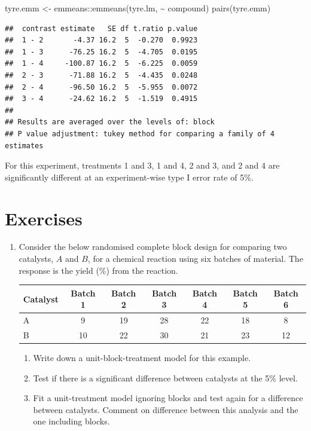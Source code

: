 \documentclass[
]{book}
\newenvironment{Shaded}{\begin{snugshade}}{\end{snugshade}}
\newcommand{\FunctionTok}[1]{\textcolor[rgb]{0.00,0.00,0.00}{#1}}
\newcommand{\NormalTok}[1]{#1}
\newcommand{\OtherTok}[1]{\textcolor[rgb]{0.56,0.35,0.01}{#1}}
\newcommand{\SpecialCharTok}[1]{\textcolor[rgb]{0.00,0.00,0.00}{#1}}
\providecommand{\tightlist}{%
  \setlength{\itemsep}{0pt}\setlength{\parskip}{0pt}}
\theoremstyle{definition}
\theoremstyle{definition}
\theoremstyle{definition}
\theoremstyle{definition}
\theoremstyle{remark}
\begin{document}
\begin{Shaded}
\begin{Highlighting}[]
\NormalTok{tyre.emm }\OtherTok{\textless{}{-}}\NormalTok{ emmeans}\SpecialCharTok{::}\FunctionTok{emmeans}\NormalTok{(tyre.lm, }\SpecialCharTok{\textasciitilde{}}\NormalTok{ compound)}
\FunctionTok{pairs}\NormalTok{(tyre.emm)}
\end{Highlighting}
\end{Shaded}

\begin{verbatim}
##  contrast estimate   SE df t.ratio p.value
##  1 - 2       -4.37 16.2  5  -0.270  0.9923
##  1 - 3      -76.25 16.2  5  -4.705  0.0195
##  1 - 4     -100.87 16.2  5  -6.225  0.0059
##  2 - 3      -71.88 16.2  5  -4.435  0.0248
##  2 - 4      -96.50 16.2  5  -5.955  0.0072
##  3 - 4      -24.62 16.2  5  -1.519  0.4915
## 
## Results are averaged over the levels of: block 
## P value adjustment: tukey method for comparing a family of 4 estimates
\end{verbatim}

For this experiment, treatments 1 and 3, 1 and 4, 2 and 3, and 2 and 4 are significantly different at an experiment-wise type I error rate of 5\%.

\hypertarget{exercises-2}{%
\section{Exercises}\label{exercises-2}}

\begin{enumerate}
\def\labelenumi{\arabic{enumi}.}
\item
  Consider the below randomised complete block design for comparing two catalysts, \(A\) and \(B\), for a chemical reaction using six batches of material. The response is the yield (\%) from the reaction.

  \begin{longtable}[]{@{}lcccccc@{}}
  \toprule
  Catalyst & Batch 1 & Batch 2 & Batch 3 & Batch 4 & Batch 5 & Batch 6 \\
  \midrule
  \endhead
  A & 9 & 19 & 28 & 22 & 18 & 8 \\
  B & 10 & 22 & 30 & 21 & 23 & 12 \\
  \bottomrule
  \end{longtable}

  \begin{enumerate}
  \def\labelenumii{\roman{enumii}.}
  \tightlist
  \item
    Write down a unit-block-treatment model for this example.
  \item
    Test if there is a significant difference between catalysts at the 5\% level.
  \item
    Fit a unit-treatment model ignoring blocks and test again for a difference between catalysts. Comment on difference between this analysis and the one including blocks.
  \end{enumerate}
\end{enumerate}
\end{document}
